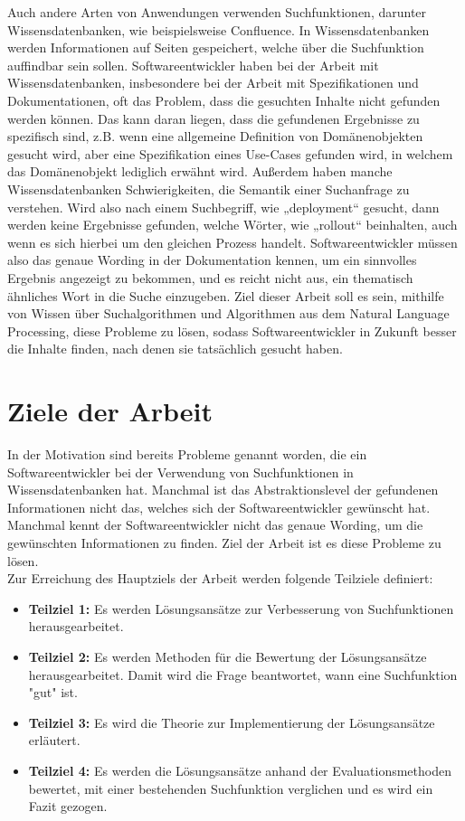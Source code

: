 Auch andere Arten von Anwendungen verwenden Suchfunktionen, darunter Wissensdatenbanken, wie beispielsweise Confluence.
In Wissensdatenbanken werden Informationen auf Seiten gespeichert, welche über die Suchfunktion auffindbar sein sollen.
Softwareentwickler haben bei der Arbeit mit Wissensdatenbanken, insbesondere bei der Arbeit mit Spezifikationen und Dokumentationen, oft das Problem, dass die gesuchten Inhalte nicht gefunden werden können.
Das kann daran liegen, dass die gefundenen Ergebnisse zu spezifisch sind, z.B. wenn eine allgemeine Definition von Domänenobjekten gesucht wird, aber eine Spezifikation eines Use-Cases gefunden wird, in welchem das Domänenobjekt lediglich erwähnt wird.
Außerdem haben manche Wissensdatenbanken Schwierigkeiten, die Semantik einer Suchanfrage zu verstehen.
Wird also nach einem Suchbegriff, wie „deployment“ gesucht, dann werden keine Ergebnisse gefunden, welche Wörter, wie „rollout“ beinhalten, auch wenn es sich hierbei um den gleichen Prozess handelt.
Softwareentwickler müssen also das genaue Wording in der Dokumentation kennen, um ein sinnvolles Ergebnis angezeigt zu bekommen, und es reicht nicht aus, ein thematisch ähnliches Wort in die Suche einzugeben.
Ziel dieser Arbeit soll es sein, mithilfe von Wissen über Suchalgorithmen und Algorithmen aus dem Natural Language Processing, diese Probleme zu lösen, sodass Softwareentwickler in Zukunft besser die Inhalte finden, nach denen sie tatsächlich gesucht haben.

\section{Ziele der Arbeit}
In der Motivation sind bereits Probleme genannt worden, die ein Softwareentwickler bei der Verwendung von Suchfunktionen in Wissensdatenbanken hat.
Manchmal ist das Abstraktionslevel der gefundenen Informationen nicht das, welches sich der Softwareentwickler gewünscht hat.
Manchmal kennt der Softwareentwickler nicht das genaue Wording, um die gewünschten Informationen zu finden.
Ziel der Arbeit ist es diese Probleme zu lösen.\\

Zur Erreichung des Hauptziels der Arbeit werden folgende Teilziele definiert:
\begin{itemize}
   \item \textbf{Teilziel 1:}
   Es werden Lösungsansätze zur Verbesserung von Suchfunktionen herausgearbeitet. 
   \item \textbf{Teilziel 2:}
   Es werden Methoden für die Bewertung der Lösungsansätze herausgearbeitet.
   Damit wird die Frage beantwortet, wann eine Suchfunktion "gut" ist. 
   \item \textbf{Teilziel 3:}
   Es wird die Theorie zur Implementierung der Lösungsansätze erläutert.
   \item \textbf{Teilziel 4:}
   Es werden die Lösungsansätze anhand der Evaluationsmethoden bewertet, mit einer bestehenden Suchfunktion verglichen und es wird ein Fazit gezogen.
\end{itemize}

